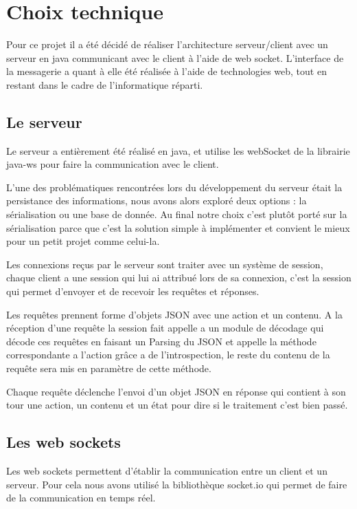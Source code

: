 \section{Choix technique}

\par Pour ce projet il a été décidé de réaliser l'architecture serveur/client avec un serveur en java communicant avec le client à l'aide de web socket. L’interface de la messagerie a quant à elle été réalisée à l'aide de technologies web, tout en restant dans le cadre de l'informatique réparti. 

\subsection{Le serveur}
\par Le serveur a entièrement été réalisé en java, et utilise les webSocket de la librairie java-ws pour faire la communication avec le client.
\par L'une des problématiques rencontrées lors du développement du serveur était la persistance des informations, nous avons alors exploré deux options : la sérialisation ou une base de donnée.
Au final notre choix c'est plutôt porté sur la sérialisation parce que c'est la solution simple à implémenter et convient le mieux pour un petit projet comme celui-la.
\par Les connexions reçus par le serveur sont traiter avec un système de session, chaque client a une session qui lui ai attribué lors de sa connexion, c'est la session qui permet d'envoyer et de recevoir les requêtes et réponses.
\par Les requêtes prennent forme d'objets JSON avec une action et un contenu. A la réception d'une requête la session fait appelle a un module de décodage qui décode ces requêtes en faisant un Parsing du JSON et appelle la méthode correspondante a l'action grâce a de l'introspection, le reste du contenu de la requête sera mis en paramètre de cette méthode.
\par Chaque requête déclenche l'envoi d'un objet JSON en réponse qui contient à son tour une action, un contenu et un état pour dire si le traitement c'est bien passé.

\subsection{Les web sockets}
\par Les web sockets permettent d'établir la communication entre un client et un serveur. Pour cela nous avons utilisé la bibliothèque socket.io qui permet de faire de la communication en temps réel. 


